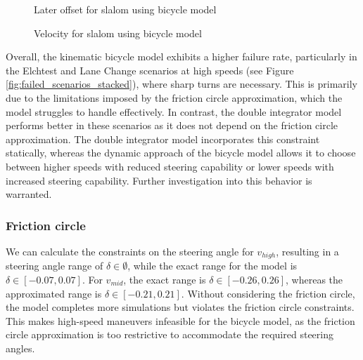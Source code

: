 \begin{figure}[h!]
	\centering
	\caption{Later offset for slalom using bicycle model}
	\label{fig:slalom_bicycle_model_n}
\end{figure}

\begin{figure}[h!]
	\centering
	\caption{Velocity for slalom using bicycle model}
	\label{fig:slalom_bicycle_model_velocity}
\end{figure}

Overall, the kinematic bicycle model exhibits a higher failure rate, particularly in the Elchtest and Lane Change scenarios at high speeds (see
Figure \ref{fig:failed_scenarios_stacked}), where sharp turns are necessary.
This is primarily due to the limitations imposed by the friction circle approximation, which the model struggles to handle effectively.
In contrast, the double integrator model performs better in these scenarios as it does not depend on the friction circle approximation.
The double integrator model incorporates this constraint statically, whereas the dynamic approach of the bicycle model allows it to choose between
higher speeds with reduced steering capability or lower speeds with increased steering capability.
Further investigation into this behavior is warranted.

\subsubsection{Friction	circle}
We can calculate the constraints on the steering angle for $v_{high}$, resulting in a steering angle range of $\delta \in \emptyset$, while the exact
range for the model is $\delta \in [-0.07, 0.07]$.
For $v_{mid}$, the exact range is $\delta \in [-0.26, 0.26]$, whereas the approximated range is $\delta \in [-0.21, 0.21]$.
Without considering the friction circle, the model completes more simulations but violates the friction circle constraints.
This makes high-speed maneuvers infeasible for the bicycle model, as the friction circle approximation is too restrictive to accommodate the required
steering angles.

